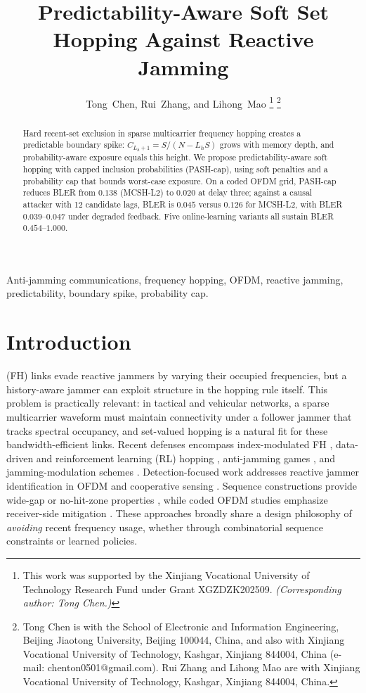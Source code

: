 \documentclass[letterpaper,journal,10pt]{IEEEtran}
\title{Predictability-Aware Soft Set Hopping Against Reactive Jamming}
\author{Tong~Chen, Rui~Zhang, and Lihong~Mao%
\thanks{This work was supported by the Xinjiang Vocational University of
Technology Research Fund under Grant XGZDZK202509. \textit{(Corresponding
author: Tong Chen.)}}%
\thanks{Tong Chen is with the School of Electronic and Information Engineering,
Beijing Jiaotong University, Beijing 100044, China, and also with Xinjiang
Vocational University of Technology, Kashgar, Xinjiang 844004, China (e-mail:
chenton0501@gmail.com). Rui Zhang and Lihong Mao are with Xinjiang Vocational
University of Technology, Kashgar, Xinjiang 844004, China.}}
\begin{document}
\maketitle

\begin{abstract}
Hard recent-set exclusion in sparse multicarrier frequency hopping
creates a predictable boundary spike:
$C_{L_h+1}=S/(N-L_hS)$ grows with memory depth, and
probability-aware exposure equals this height. We propose
predictability-aware soft hopping with capped inclusion probabilities
(PASH-cap), using soft penalties and a probability cap that bounds
worst-case exposure. On a coded OFDM grid, PASH-cap reduces BLER from
$0.138$ (MCSH-L2) to $0.020$ at delay three; against a causal attacker with 12
candidate lags, BLER is $0.045$ versus $0.126$ for MCSH-L2, with BLER $0.039$--$0.047$ under degraded feedback.
Five online-learning variants all sustain BLER $0.454$--$1.000$.
\end{abstract}

\begin{IEEEkeywords}
Anti-jamming communications, frequency hopping, OFDM, reactive jamming,
predictability, boundary spike, probability cap.
\end{IEEEkeywords}

\section{Introduction}
 (FH) links evade reactive jammers by varying their occupied
frequencies, but a history-aware jammer can exploit structure in the hopping
rule itself. This problem is practically relevant: in tactical and vehicular
networks, a sparse multicarrier waveform must maintain connectivity under a
follower jammer that tracks spectral occupancy, and set-valued hopping is a
natural fit for these bandwidth-efficient links. Recent defenses encompass index-modulated FH
\cite{shi2022enhanced}, data-driven and reinforcement learning (RL) hopping
\cite{zhou2024,zhang2024block,qi2024,cheng2025,chen2026dual}, anti-jamming games
\cite{zhang2024game}, and jamming-modulation schemes \cite{ma2023}.
Detection-focused work addresses reactive jammer identification in OFDM
\cite{altun2022reactive,wesolowski2023detection} and cooperative sensing
\cite{li2024}. Sequence constructions provide wide-gap or no-hit-zone
properties \cite{shu2024widegap,zheng2025widegap}, while coded OFDM studies
emphasize receiver-side mitigation \cite{mailaender2013,kaplan2023,chen2023,mendonca2024channel,wu2026llr}.
These approaches broadly share a design philosophy of \emph{avoiding} recent
frequency usage, whether through combinatorial sequence constraints or learned
policies.
\end{document}

